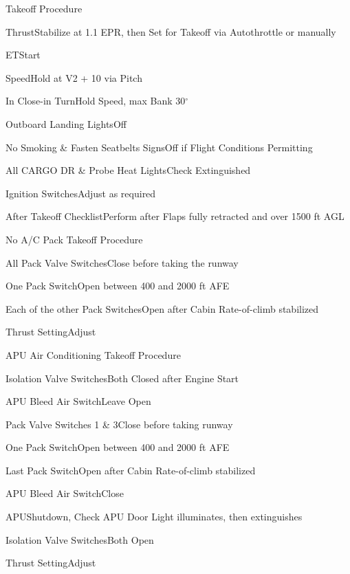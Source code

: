 \documentclass[sim-use, blue_items]{checklist}
\begin{document}
\begin{checklist}{Takeoff Procedure}
	\item{Thrust}{Stabilize at 1.1 EPR, then Set for Takeoff via Autothrottle or manually}
	\item{ET}{Start}
	\item{Speed}{Hold at V2 + 10 via Pitch}
	\item{In Close-in Turn}{Hold Speed, max Bank 30$^\circ$}
	\item{Outboard Landing Lights}{Off}
	\item{No Smoking \& Fasten Seatbelts Signs}{Off if Flight Conditions Permitting}
	\item{All CARGO DR \& Probe Heat Lights}{Check Extinguished}
	\item{Ignition Switches}{Adjust as required}
	\item{After Takeoff Checklist}{Perform after Flaps fully retracted and over 1500 ft AGL}
\end{checklist}

\begin{checklist}{No A/C Pack Takeoff Procedure}
	\item{All Pack Valve Switches}{Close before taking the runway}
	\item{One Pack Switch}{Open between 400 and 2000 ft AFE}
	\item{Each of the other Pack Switches}{Open after Cabin Rate-of-climb stabilized}
	\item{Thrust Setting}{Adjust}
\end{checklist}

\begin{checklist}{APU Air Conditioning Takeoff Procedure}
	\item{Isolation Valve Switches}{Both Closed after Engine Start}
	\item{APU Bleed Air Switch}{Leave Open}
	\item{Pack Valve Switches 1 \& 3}{Close before taking runway}
	\item{One Pack Switch}{Open between 400 and 2000 ft AFE}
	\item{Last Pack Switch}{Open after Cabin Rate-of-climb stabilized}
	\item{APU Bleed Air Switch}{Close}
	\item{APU}{Shutdown, Check APU Door Light illuminates, then extinguishes}
	\item{Isolation Valve Switches}{Both Open}
	\item{Thrust Setting}{Adjust}
\end{checklist}
\end{document}
